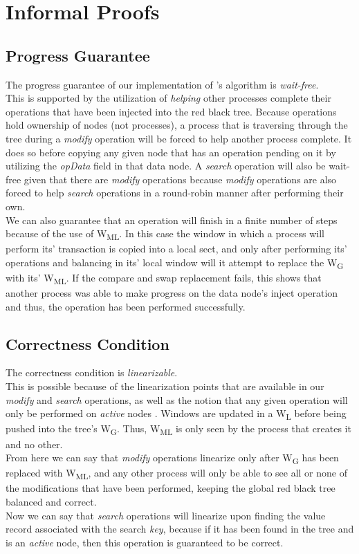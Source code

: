\documentclass[letterpaper, 10 pt, conference]{ieeeconf}
\begin{document}
\section{Informal Proofs}

	\subsection{Progress Guarantee}
	The progress guarantee of our implementation of \cite{c1}'s algorithm is \textit{wait-free}. \\
	This is supported by the utilization of \textit{helping} other processes complete their operations that have been injected into the red black tree. Because operations hold ownership of nodes (not processes), a process that is traversing through the tree during a \textit{modify} operation will be forced to help another process complete. It does so before copying any given node that has an operation pending on it by utilizing the \textit{opData} field in that data node. A \textit{search} operation will also be wait-free given that there are \textit{modify} operations because \textit{modify} operations are also forced to help \textit{search} operations in a round-robin manner after performing their own.\\
	We can also guarantee that an operation will finish in a finite number of steps because of the use of W\textsubscript{ML}. In this case the window in which a process will perform its' transaction is copied into a local sect, and only after performing its' operations and balancing in its' local window will it attempt to replace the W\textsubscript{G} with its' W\textsubscript{ML}. If the compare and swap replacement fails, this shows that another process was able to make progress on the data node's inject operation and thus, the operation has been performed successfully.
	\subsection{Correctness Condition}
	The correctness condition is \textit{linearizable}. \\
	This is possible because of the linearization points that are available in our \textit{modify} and \textit{search} operations, as well as the notion that any given operation will only be performed on \textit{active} nodes \cite{c5}. Windows are updated in a W\textsubscript{L} before being pushed into the tree's W\textsubscript{G}. Thus, W\textsubscript{ML} is only seen by the process that creates it and no other. \\
	From here we can say that \textit{modify} operations linearize only after W\textsubscript{G} has been replaced with W\textsubscript{ML}, and any other process will only be able to see all or none of the modifications that have been performed, keeping the global red black tree balanced and correct. \\
	Now we can say that \textit{search} operations will linearize upon finding the value record associated with the search \textit{key}, because if it has been found in the tree and is an \textit{active} node, then this operation is guaranteed to be correct.
	
\end{document}
